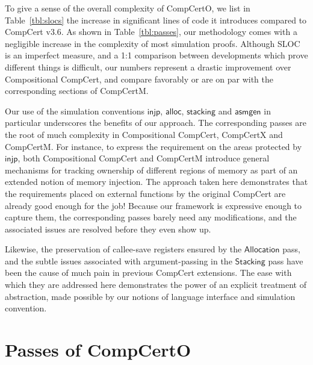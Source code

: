\documentclass[11pt,oneside,draft]{book}
\theoremstyle{definition}
\newcommand{\kw}[1]{\ensuremath{ \mathsf{#1} }}
\begin{document}
To give a sense of the overall complexity of CompCertO,
we list in Table~\ref{tbl:slocs}
the increase in significant lines of code it introduces
compared to CompCert v$3.6$.
As shown in Table~\ref{tbl:passes},
our methodology comes with a negligible increase
in the complexity of most simulation proofs.
Although SLOC is an imperfect measure,
and a 1:1 comparison between developments which
prove different things is difficult,
our numbers represent
a drastic improvement over Compositional CompCert,
and compare favorably
or are on par with
the corresponding sections of CompCertM.

Our use of the simulation conventions
\kw{injp}, \kw{alloc}, \kw{stacking} and \kw{asmgen}
in particular
underscores the benefits of our approach.
The corresponding passes are the root of
much complexity
in Compositional CompCert, CompCertX and CompCertM.
For instance,
to express the requirement on
the areas protected by \kw{injp},
both Compositional CompCert and CompCertM
introduce general mechanisms for tracking ownership of
different regions of memory
as part of an extended notion of memory injection.
The approach taken here demonstrates that
the requirements placed on external functions
by the original CompCert
are already good enough for the job!
Because our framework is expressive enough to capture them,
the corresponding passes barely need any modifications,
and the associated issues are resolved before they even show up.

Likewise, the preservation of callee-save registers
ensured by the \kw{Allocation} pass,
and the subtle issues associated with argument-passing
in the \kw{Stacking} pass
have been the cause of much pain
in previous CompCert extensions.
The ease with which they are addressed here
demonstrates the power of
an explicit treatment of abstraction,
made possible
by our notions of language interface and simulation convention.



\chapter{Passes of CompCertO} %
\end{document}
